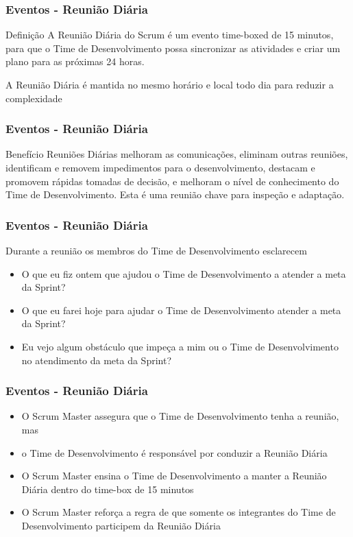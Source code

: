 \begin{frame}
 \frametitle{Eventos - Reunião Diária}
\begin{block}{Definição}
 A Reunião Diária do Scrum é um evento time-boxed de 15 minutos, para que o Time de
Desenvolvimento possa sincronizar as atividades e criar um plano para as próximas 24 horas.
 \end{block}
 \begin{block}{}
  A Reunião Diária é mantida no mesmo horário e local todo dia para reduzir a complexidade
 \end{block}
\end{frame}

\begin{frame}
 \frametitle{Eventos - Reunião Diária}
\begin{block}{Benefício}
Reuniões Diárias melhoram as comunicações, eliminam outras reuniões, identificam e
removem impedimentos para o desenvolvimento, destacam e promovem rápidas tomadas de
decisão, e melhoram o nível de conhecimento do Time de Desenvolvimento. Esta é uma
reunião chave para inspeção e adaptação.
 \end{block}

\end{frame}


\begin{frame}
 \frametitle{Eventos - Reunião Diária}
Durante a reunião os membros do Time de Desenvolvimento esclarecem
 \begin{itemize}
  \item O que eu fiz ontem que ajudou o Time de Desenvolvimento a atender a meta da Sprint?
  \item O que eu farei hoje para ajudar o Time de Desenvolvimento atender a meta da Sprint?
  \item  Eu vejo algum obstáculo que impeça a mim ou o Time de Desenvolvimento no atendimento
da meta da Sprint?
 \end{itemize}
\end{frame}


\begin{frame}
 \frametitle{Eventos - Reunião Diária}
 \begin{itemize}
  \item O Scrum Master assegura que o Time de Desenvolvimento tenha a reunião, mas
  \item o Time de Desenvolvimento é responsável por conduzir a Reunião Diária
  \item O Scrum Master ensina o Time de Desenvolvimento a manter a Reunião Diária dentro do time-box de 15 minutos
  \item O Scrum Master reforça a regra de que somente os integrantes do Time de Desenvolvimento
participem da Reunião Diária
 \end{itemize}
\end{frame}

